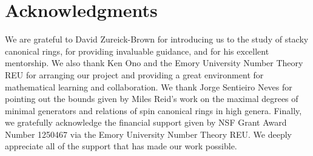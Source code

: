 \documentclass{amsart}
\theoremstyle{plain}
\theoremstyle{definition}
\theoremstyle{remark}
\numberwithin{equation}{section}
\begin{document}

\section{Acknowledgments}
We are grateful to David Zureick-Brown for introducing us to the
study of stacky canonical rings, for providing invaluable guidance,
and for his excellent mentorship. We also thank Ken Ono and the
Emory University Number Theory REU for arranging our project and
providing a great environment for mathematical learning and
collaboration. We thank Jorge Sentieiro Neves for pointing out the
bounds given by Miles Reid's work on the maximal degrees of minimal
generators and relations of spin canonical rings in high genera.
Finally, we gratefully acknowledge the financial support given by
NSF Grant Award Number 1250467 via the Emory University Number
Theory REU. We deeply appreciate all of the support that has made
our work possible.


\nocite{*}
{}

\end{document}
